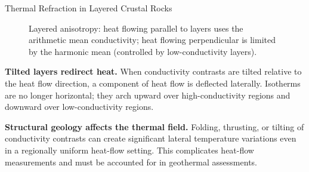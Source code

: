 \begin{activity}{Thermal Refraction in Layered Crustal Rocks}
{{\begin{figure}[h]
\caption{Layered anisotropy: heat flowing parallel to layers uses the arithmetic mean conductivity; heat flowing perpendicular is limited by the harmonic mean (controlled by low-conductivity layers).}
\end{figure}
}

\textbf{Tilted layers redirect heat.} When conductivity contrasts are tilted relative to the heat flow direction, a component of heat flow is deflected laterally. Isotherms are no longer horizontal; they arch upward over high-conductivity regions and downward over low-conductivity regions.

\textbf{Structural geology affects the thermal field.} Folding, thrusting, or tilting of conductivity contrasts can create significant lateral temperature variations even in a regionally uniform heat-flow setting. This complicates heat-flow measurements and must be accounted for in geothermal assessments.
}

\end{activity}